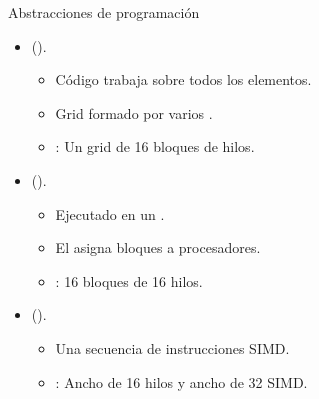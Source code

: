 \begin{frame}[t]{Abstracciones de programación}
\begin{itemize}
  \item {} ().
    \begin{itemize}
      \item Código trabaja sobre todos los elementos.
      \item Grid formado por varios .
      \item {}: Un grid de 16 bloques de hilos.
    \end{itemize}

  \item {} ().
    \begin{itemize}
      \item Ejecutado en un .
      \item El  
            asigna bloques a procesadores.
      \item {}: 16 bloques de 16 hilos.
    \end{itemize}

  \item {} ().
    \begin{itemize}
      \item Una secuencia de instrucciones SIMD.
      \item {}: Ancho de 16 hilos y ancho de 32 SIMD.
    \end{itemize}
\end{itemize}
\end{frame}

